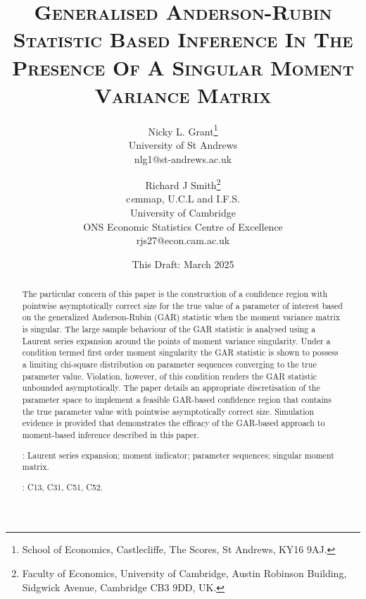 \documentclass[hidelinks, 11 pt, a4paper, pdflatex]{article}
\begin{document}

\title{\textsc{Generalised Anderson-Rubin Statistic Based Inference In The Presence Of A Singular Moment Variance Matrix}}
{\author{Nicky L. Grant\thanks{School of Economics, Castlecliffe, The Scores, St Andrews, KY16 9AJ.}
\\ University of St Andrews \\ nlg1@st-andrews.ac.uk
\and
Richard J Smith\thanks{Faculty of Economics, University of Cambridge, Austin Robinson Building, Sidgwick Avenue, Cambridge CB3 9DD, UK.}
\\ c{\it e}mmap, U.C.L and I.F.S. \\ University of Cambridge \\ ONS Economic Statistics Centre of Excellence \\ rjs27@econ.cam.ac.uk}

\date{This Draft: March 2025}
\maketitle

 \begin{abstract}

  The particular concern of this paper is the construction of a confidence region with pointwise asymptotically correct size for the true value of a parameter of interest based on the generalized Anderson-Rubin (GAR) statistic when the moment variance matrix is singular. The large sample behaviour of the GAR statistic is analysed using a Laurent series expansion around the points of moment variance singularity. Under a condition termed first order moment singularity the GAR statistic is shown to possess a limiting chi-square distribution on parameter sequences converging to the true parameter value. Violation, however, of this condition renders the GAR statistic unbounded asymptotically. The paper details an appropriate discretisation of the parameter space to implement a feasible GAR-based confidence region that contains the true parameter value with pointwise asymptotically correct size. Simulation evidence is provided that demonstrates the efficacy of the GAR-based approach to moment-based inference described in this paper.

\vspace*{0.3\baselineskip}
: Laurent series expansion; moment indicator; parameter sequences; singular moment matrix.

\vspace*{0.3\baselineskip}
: C13, C31, C51, C52.


\end{abstract}}
\end{document}
